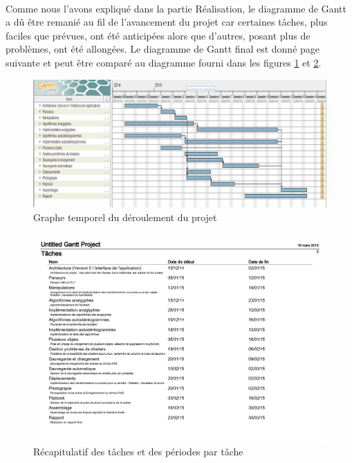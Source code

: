 \paragraph{}
Comme nous l'avons expliqué dans la partie Réalisation, le diagramme de Gantt a dû être remanié au fil de l'avancement du projet car certaines tâches, plus faciles que prévues, ont été anticipées alors que d'autres, posant plus de problèmes, ont été allongées.
Le diagramme de Gantt final est donné page suivante et peut être comparé au diagramme fourni dans les figures \ref{fig:graphGantF} et \ref{fig:gantF}.

\newpage
\begin{figure}[h]
	\centering
        \begin{sideways}
                \includegraphics[scale=0.42]{graphGantF.jpg}
        \end{sideways}
	\caption{\label{fig:graphGantF} Graphe temporel du déroulement du projet \protect \footnotemark }
\end{figure}

\begin{figure}[h]
	\centering
	\includegraphics[scale=0.6]{gantf.pdf}
	\caption{\label{fig:gantF} Récapitulatif des tâches et des périodes par tâche \protect \footnotemark }
\end{figure}

